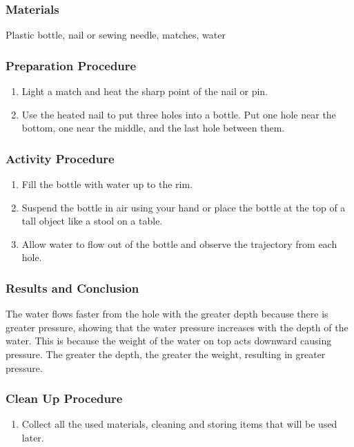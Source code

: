 \subsubsection*{Materials}
Plastic bottle, nail or sewing needle, matches, water


\subsubsection*{Preparation Procedure}
\begin{enumerate}
\item{Light a match and heat the sharp point of the nail or pin.} 
\item{Use the heated nail to put three holes into a bottle. Put one hole near the bottom, one near the middle, and the last hole between them.} 
\end{enumerate}

\subsubsection*{Activity Procedure}
\begin{enumerate}
\item{Fill the bottle with water up to the rim.} 
\item{Suspend the bottle in air using your hand or place the bottle at the top of a tall object like a stool on a table.} 
\item{Allow water to flow out of the bottle and observe the trajectory from each hole.} 
\end{enumerate}

\subsubsection*{Results and Conclusion}
The water flows faster from the hole with the greater depth because there is greater pressure, showing that the water pressure increases with the depth of the water. This is because the weight of the water on top acts downward causing pressure. The greater the depth, the greater the weight, resulting in greater pressure. 

\subsubsection*{Clean Up Procedure}
\begin{enumerate}
\item{Collect all the used materials, cleaning and storing items that will be used later. } 
\end{enumerate}

